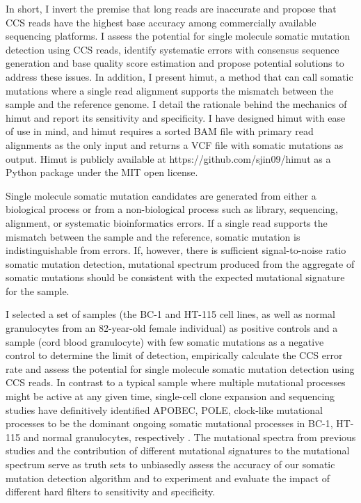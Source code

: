 In short, I invert the premise that long reads are inaccurate and propose that CCS reads have the highest base accuracy among commercially available sequencing platforms. I assess the potential for single molecule somatic mutation detection using CCS reads, identify systematic errors with consensus sequence generation and base quality score estimation and propose potential solutions to address these issues. In addition, I present himut, a method that can call somatic mutations where a single read alignment supports the mismatch between the sample and the reference genome. I detail the rationale behind the mechanics of himut and report its sensitivity and specificity. I have designed himut with ease of use in mind, and himut requires a sorted BAM file with primary read alignments as the only input and returns a VCF file with somatic mutations as output. Himut is publicly available at https://github.com/sjin09/himut as a Python package under the MIT open license.

Single molecule somatic mutation candidates are generated from either a biological process or from a non-biological process such as library, sequencing, alignment, or systematic bioinformatics errors. If a single read supports the mismatch between the sample and the reference, somatic mutation is indistinguishable from errors. If, however, there is sufficient signal-to-noise ratio somatic mutation detection, mutational spectrum produced from the aggregate of somatic mutations should be consistent with the expected mutational signature for the sample. 

I selected a set of samples (the BC-1 and HT-115 cell lines, as well as normal granulocytes from an 82-year-old female individual) as positive controls and a sample (cord blood granulocyte) with few somatic mutations as a negative control to determine the limit of detection, empirically calculate the CCS error rate and assess the potential for single molecule somatic mutation detection using CCS reads. In contrast to a typical sample where multiple mutational processes might be active at any given time, single-cell clone expansion and sequencing studies have definitively identified APOBEC, POLE, clock-like mutational processes to be the dominant ongoing somatic mutational processes in BC-1, HT-115 and normal granulocytes, respectively \cite{Petljak2019-wi, Mitchell2022-ry}. The mutational spectra from previous studies and the contribution of different mutational signatures to the mutational spectrum serve as truth sets to unbiasedly assess the accuracy of our somatic mutation detection algorithm and to experiment and evaluate the impact of different hard filters to sensitivity and specificity.

